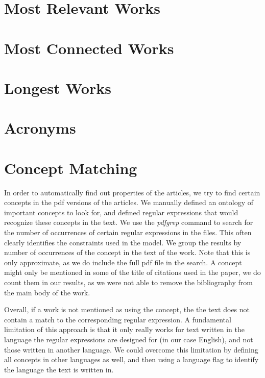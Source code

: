 \documentclass[a4paper]{article}
\begin{document}


\clearpage
\section{Most Relevant Works}



\clearpage
\section{Most Connected Works}



\clearpage
\section{Longest Works}



\clearpage
\section{Acronyms}



\clearpage
\section{Concept Matching}

In order to automatically find out properties of the articles, we try to find certain concepts in the pdf versions of the articles. We manually defined an ontology of important concepts to look for, and defined regular expressions that would recognize these concepts in the text. We use the \emph{pdfgrep} command to search for the number of occurrences of certain regular expressions in the files. This often clearly identifies the constraints used in the model. We group the results by number of occurrences of the concept in the text of the work. Note that this is only approximate, as we do include the full pdf file in the search. A concept might only be mentioned in some of the title of citations used in the paper, we do count them in our results, as we were not able to remove the bibliography from the main body of the work.

Overall, if a work is not mentioned as using the concept, the the text does not contain a match to the corresponding regular expression. A fundamental limitation of this approach is that it only really works for text written in the language the regular expressions are designed for (in our case English), and not those written in another language. We could overcome this limitation by defining all concepts in other languages as well, and then using a language flag to identify the language the text is written in. 
\end{document}
